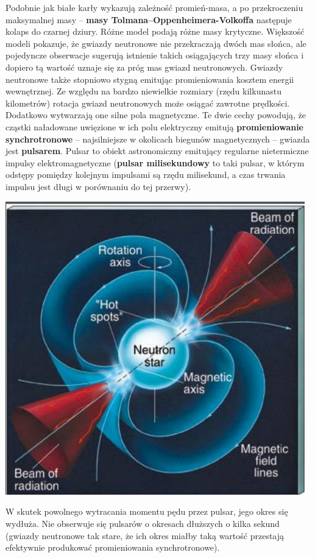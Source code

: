 \documentclass[../index.tex]{subfiles}
\begin{document}
            Podobnie jak białe karły wykazują zależność promień-masa, a po przekroczeniu maksymalnej masy – \textbf{masy Tolmana–Oppenheimera-Volkoffa} następuje kolaps do czarnej dziury. Różne model podają różne masy krytyczne. Większość modeli pokazuje, że gwiazdy neutronowe nie przekraczają dwóch mas słońca, ale pojedyncze obserwacje sugerują istnienie takich osiągających trzy masy słońca i dopiero tą wartość uznaje się za próg mas gwiazd neutronowych. Gwiazdy neutronowe także stopniowo stygną emitując promieniowania kosztem energii wewnętrznej. Ze względu na bardzo niewielkie rozmiary (rzędu kilkunastu kilometrów) rotacja gwiazd neutronowych może osiągać zawrotne prędkości. Dodatkowo wytwarzają one silne pola magnetyczne. Te dwie cechy powodują, że cząstki naładowane uwięzione w ich polu elektryczny emitują \textbf{promieniowanie synchrotronowe} – najsilniejsze w okolicach biegunów magnetycznych – gwiazda jest \textbf{pulsarem}. Pulsar to obiekt astronomiczny emitujący regularne nietermiczne impulsy elektromagnetyczne (\textbf{pulsar milisekundowy} to taki pulsar, w którym odstępy pomiędzy kolejnym impulsami są rzędu milisekund, a czas trwania impulsu jest długi w porównaniu do tej przerwy).
            \begin{center}
                \includegraphics[width=13cm]{images/pulsar.png}
            \end{center}
            W skutek powolnego wytracania momentu pędu przez pulsar, jego okres się wydłuża. Nie obserwuje się pulsarów o okresach dłuższych o kilka sekund (gwiazdy neutronowe tak stare, że ich okres miałby taką wartość przestają efektywnie produkować promieniowania synchrotronowe).
\end{document}
